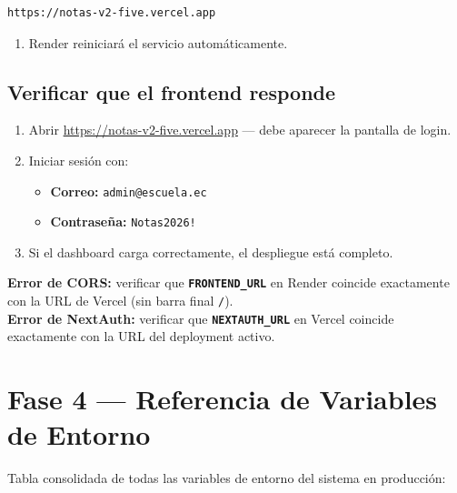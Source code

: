 \documentclass[12pt, a4paper]{article}
\newcommand{\cmd}[1]{\texttt{#1}}
\newcommand{\var}[1]{\texttt{\textbf{#1}}}
\begin{document}
\begin{lstlisting}[style=texto]
https://notas-v2-five.vercel.app
\end{lstlisting}

\begin{enumerate}[resume]
    \item Render reiniciará el servicio automáticamente.
\end{enumerate}

\subsection{Verificar que el frontend responde}

\begin{enumerate}
    \item Abrir \url{https://notas-v2-five.vercel.app} --- debe aparecer la pantalla de login.
    \item Iniciar sesión con:
    \begin{itemize}
        \item \textbf{Correo:} \cmd{admin@escuela.ec}
        \item \textbf{Contraseña:} \cmd{Notas2026!}
    \end{itemize}
    \item Si el dashboard carga correctamente, el despliegue está completo.
\end{enumerate}

\begin{importante}
    \textbf{Error de CORS:} verificar que \var{FRONTEND\_URL} en Render coincide exactamente con la URL de Vercel (sin barra final \cmd{/}).\\[0.3cm]
    \textbf{Error de NextAuth:} verificar que \var{NEXTAUTH\_URL} en Vercel coincide exactamente con la URL del deployment activo.
\end{importante}

\newpage
\section{Fase 4 --- Referencia de Variables de Entorno}

Tabla consolidada de todas las variables de entorno del sistema en producción:
\end{document}
